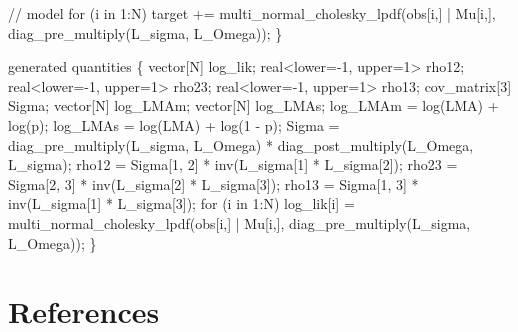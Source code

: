 \documentclass[
  12pt,
  letterpaper,
  DIV=11,
  numbers=noendperiod]{scrartcl}
\newenvironment{Shaded}{\begin{snugshade}}{\end{snugshade}}
\newcommand{\CommentTok}[1]{\textcolor[rgb]{0.37,0.37,0.37}{#1}}
\newcommand{\ControlFlowTok}[1]{\textcolor[rgb]{0.00,0.23,0.31}{#1}}
\newcommand{\DataTypeTok}[1]{\textcolor[rgb]{0.68,0.00,0.00}{#1}}
\newcommand{\DecValTok}[1]{\textcolor[rgb]{0.68,0.00,0.00}{#1}}
\newcommand{\KeywordTok}[1]{\textcolor[rgb]{0.00,0.23,0.31}{#1}}
\newcommand{\NormalTok}[1]{\textcolor[rgb]{0.00,0.23,0.31}{#1}}
\begin{document}
\begin{Shaded}
\begin{Highlighting}[]
  \CommentTok{// model}
  \ControlFlowTok{for}\NormalTok{ (i }\ControlFlowTok{in} \DecValTok{1}\NormalTok{:N)}
     \KeywordTok{target +=}\NormalTok{ multi\_normal\_cholesky\_lpdf(obs[i,] | Mu[i,], diag\_pre\_multiply(L\_sigma, L\_Omega));}
\NormalTok{\}}

\KeywordTok{generated quantities}\NormalTok{ \{}
  \DataTypeTok{vector}\NormalTok{[N] log\_lik;}
  \DataTypeTok{real}\NormalTok{\textless{}}\KeywordTok{lower}\NormalTok{={-}}\DecValTok{1}\NormalTok{, }\KeywordTok{upper}\NormalTok{=}\DecValTok{1}\NormalTok{\textgreater{} rho12;}
  \DataTypeTok{real}\NormalTok{\textless{}}\KeywordTok{lower}\NormalTok{={-}}\DecValTok{1}\NormalTok{, }\KeywordTok{upper}\NormalTok{=}\DecValTok{1}\NormalTok{\textgreater{} rho23;}
  \DataTypeTok{real}\NormalTok{\textless{}}\KeywordTok{lower}\NormalTok{={-}}\DecValTok{1}\NormalTok{, }\KeywordTok{upper}\NormalTok{=}\DecValTok{1}\NormalTok{\textgreater{} rho13;}
  \DataTypeTok{cov\_matrix}\NormalTok{[}\DecValTok{3}\NormalTok{] Sigma;}
  \DataTypeTok{vector}\NormalTok{[N] log\_LMAm;}
  \DataTypeTok{vector}\NormalTok{[N] log\_LMAs;}
\NormalTok{  log\_LMAm = log(LMA) + log(p);}
\NormalTok{  log\_LMAs = log(LMA) + log(}\DecValTok{1}\NormalTok{ {-} p);}
\NormalTok{  Sigma = diag\_pre\_multiply(L\_sigma, L\_Omega)}
\NormalTok{     * diag\_post\_multiply(L\_Omega\textquotesingle{}, L\_sigma);}
\NormalTok{  rho12 = Sigma[}\DecValTok{1}\NormalTok{, }\DecValTok{2}\NormalTok{] * inv(L\_sigma[}\DecValTok{1}\NormalTok{] * L\_sigma[}\DecValTok{2}\NormalTok{]);}
\NormalTok{  rho23 = Sigma[}\DecValTok{2}\NormalTok{, }\DecValTok{3}\NormalTok{] * inv(L\_sigma[}\DecValTok{2}\NormalTok{] * L\_sigma[}\DecValTok{3}\NormalTok{]);}
\NormalTok{  rho13 = Sigma[}\DecValTok{1}\NormalTok{, }\DecValTok{3}\NormalTok{] * inv(L\_sigma[}\DecValTok{1}\NormalTok{] * L\_sigma[}\DecValTok{3}\NormalTok{]);}
  \ControlFlowTok{for}\NormalTok{ (i }\ControlFlowTok{in} \DecValTok{1}\NormalTok{:N)}
\NormalTok{   log\_lik[i] = multi\_normal\_cholesky\_lpdf(obs[i,] | Mu[i,], diag\_pre\_multiply(L\_sigma, L\_Omega));}
\NormalTok{ \}}
\end{Highlighting}
\end{Shaded}

\hypertarget{references}{%
\section*{References}\label{references}}
\end{document}
